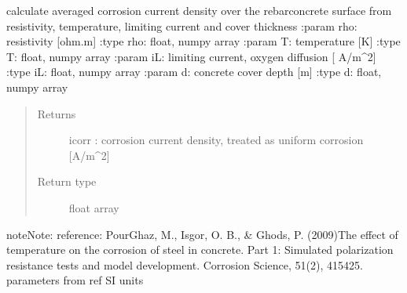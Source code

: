 \documentclass[letterpaper,10pt,english]{sphinxmanual}
\begin{document}

\begin{fulllineitems}
\label{\detokenize{corrosion:corrosion.icorr_base}}
\sphinxAtStartPar
calculate averaged corrosion current density over the rebar\sphinxhyphen{}concrete surface from resistivity, temperature, limiting current and cover thickness
:param rho: resistivity {[}ohm.m{]}
:type rho: float, numpy array
:param T: temperature {[}K{]}
:type T: float, numpy array
:param iL: limiting current, oxygen diffusion {[} A/m\textasciicircum{}2{]}
:type iL: float, numpy array
:param d: concrete cover depth {[}m{]}
:type d: float, numpy array
\begin{quote}\begin{description}
\item[{Returns}] \leavevmode
\sphinxAtStartPar
icorr : corrosion current density, treated as uniform corrosion {[}A/m\textasciicircum{}2{]}

\item[{Return type}] \leavevmode
\sphinxAtStartPar
float array

\end{description}\end{quote}

\begin{sphinxadmonition}{note}{Note:}
\sphinxAtStartPar
reference: Pour\sphinxhyphen{}Ghaz, M., Isgor, O. B., \& Ghods, P. (2009)The effect of temperature on the corrosion of steel in concrete. Part 1: Simulated polarization resistance tests and model development. Corrosion Science, 51(2), 415\textendash{}425. 
parameters from ref
SI units
\end{sphinxadmonition}

\end{fulllineitems}

\end{document}
